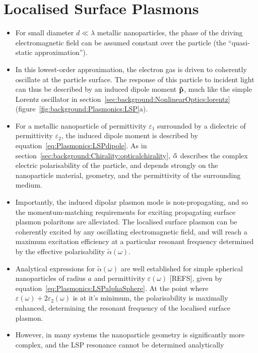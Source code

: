 \section{Localised Surface Plasmons}\label{sec:background:Plasmonics:Metamaterials}
\begin{itemize}
    \item For small diameter $d \ll \lambda$ metallic nanoparticles, the phase of the driving electromagnetic field can be assumed constant over the particle (the ``quasi-static approximation'').
    \item In this lowest-order approximation, the electron gas is driven to coherently oscillate at the particle surface. The response of this particle to incident light can thus be described by an induced dipole moment $\bf{\tilde p}$, much like the simple Lorentz oscillator in section~\ref{sec:background:NonlinearOptics:lorentz} (figure~\ref{fig:background:Plasmonics:LSP}a).
    \item For a metallic nanoparticle of permittivity $\varepsilon_1$ surrounded by a dielectric of permittivity $\varepsilon_2$, the induced dipole moment is described by equation~\ref{eq:Plasmonics:LSPdipole}. As in section~\ref{sec:background:Chirality:opticalchirality}, $\bf{\tilde \alpha }$ describes the complex electric polarisability of the particle, and depends strongly on the nanoparticle material, geometry, and the permittivity of the surrounding medium.
    \item Importantly, the induced dipolar plasmon mode is non-propagating, and so the momentum-matching requirements for exciting propagating surface plasmon polaritons are alleviated. The localised surface plasmon can be coherently excited by any oscillating electromagnetic field, and will reach a maximum excitation efficiency at a particular resonant frequency determined by the effective polarisability ${\tilde \alpha }(\omega)$.
    \item Analytical expressions for ${\tilde \alpha }(\omega)$ are well established for simple spherical nanoparticles of radius $a$ and permittivity $\varepsilon(\omega)$ [REFS], given by equation~\ref{eq:Plasmonics:LSPalphaSphere}. At the point where $\varepsilon (\omega) + 2\varepsilon_2 (\omega)$ is at it's minimum, the polarisability is maximally enhanced, determining the resonant frequency of the localised surface plasmon.
    \item However, in many systems the nanoparticle geometry is significantly more complex, and the LSP resonance cannot be determined analytically
\end{itemize}

